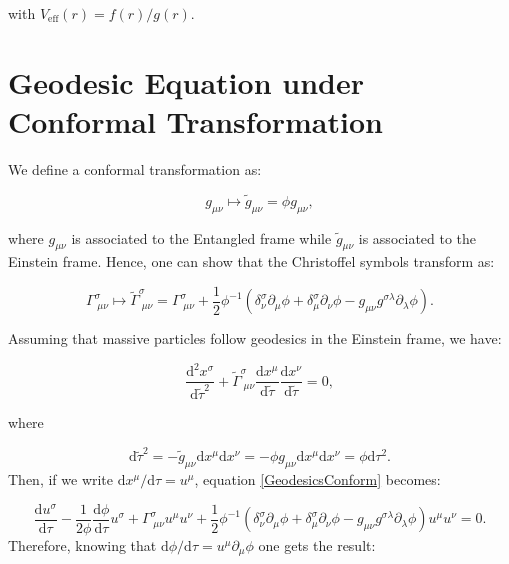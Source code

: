 \documentclass[floats,floatfix,aps, preprintnumbers,nofootinbib]{revtex4-2}
\newcommand{\mrm}{\mathrm}
\begin{document}
with $V_\mrm{eff}(r) = f(r) / g(r)$.




\section{Geodesic Equation under Conformal Transformation}
\label{appendix:conformal}

We define a conformal transformation as:

\begin{equation}
    g_{\mu\nu} \mapsto \tilde g_{\mu\nu} = \phi g_{\mu\nu},
\end{equation}

where $g_{\mu\nu}$ is associated to the Entangled frame while $\tilde g_{\mu\nu}$ is associated to the Einstein frame. Hence, one can show that the Christoffel symbols transform as:

\begin{equation}
    \Gamma^\sigma_{\;\mu\nu} \mapsto \tilde\Gamma^\sigma_{\;\mu\nu} = \Gamma^\sigma_{\;\mu\nu} + \frac{1}{2}\phi^{-1}(\delta^\sigma_\nu\partial_\mu\phi + \delta^\sigma_\mu\partial_\nu\phi - g_{\mu\nu}g^{\sigma\lambda}\partial_\lambda\phi).
\end{equation}

Assuming that massive particles follow geodesics in the Einstein frame, we have:

\begin{equation}\label{GeodesicsConform}
    \frac{\mrm d^2x^\sigma}{\mrm d\tilde\tau^2} + \tilde\Gamma^\sigma_{\;\mu\nu}\frac{\mrm dx^\mu}{\mrm d\tilde\tau}\frac{\mrm dx^\nu}{\mrm d\tilde\tau} = 0,
\end{equation}

where

\begin{equation}
    \mrm d\tilde\tau^2 = -\tilde g_{\mu\nu}\mrm dx^\mu \mrm dx^\nu = - \phi g_{\mu\nu}\mrm dx^\mu \mrm dx^\nu = \phi\mrm d\tau^2.
\end{equation}
Then, if we write $\mrm dx^\mu/\mrm d\tau = u^\mu$, equation \ref{GeodesicsConform} becomes:

\begin{equation}
    \frac{\mrm d u^\sigma}{\mrm d\tau} - \frac{1}{2\phi}\frac{\mrm d\phi}{\mrm d\tau}u^\sigma + \Gamma^\sigma_{\;\mu\nu}u^\mu u^\nu + \frac{1}{2}\phi^{-1}(\delta^\sigma_\nu\partial_\mu\phi + \delta^\sigma_\mu\partial_\nu\phi - g_{\mu\nu}g^{\sigma\lambda}\partial_\lambda\phi) u^\mu u^\nu = 0.
\end{equation}
Therefore, knowing that $\mrm d\phi /\mrm d\tau = u^\mu\partial_\mu\phi$ one gets the result:
\end{document}
